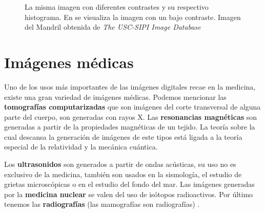 \begin{figure}[h]
    \centering


    \bigskip


    \bigskip


  \caption[Histogramas]{La misma imagen con diferentes contrastes y su
  respectivo histograma. En \protect{} se visualiza la imagen con
  un bajo contraste. Imagen del Mandril obtenida de \textit{The USC-SIPI Image
  Database}}
  
  \label{fig:histograms}
\end{figure}

\section{Imágenes médicas}

Uno de los usos más importantes de las imágenes digitales recae en la medicina,
existe una gran variedad de imágenes médicas. Podemos mencionar las
\textbf{tomografías computarizadas} que son imágenes del corte transversal de
alguna parte del cuerpo, son generadas con rayos X. Las \textbf{resonancias
magnéticas} son generadas a partir de la propiedades magnéticas de un tejido.
La teoría sobre la cual descansa la generación de imágenes de este tipos está
ligada a la teoría especial de la relatividad y la mecánica cuántica.

Los \textbf{ultrasonidos} son generados a partir de ondas acústicas, su uso no
es exclusivo de la medicina, también son usados en la sismología, el estudio de
grietas microscópicas o en el estudio del fondo del mar. Las imágenes generadas
por la \textbf{medicina nuclear} se valen del uso de isótopos radioactivos. Por
último tenemos las \textbf{radiografías} (las mamografías son radiografías)
\cite{suetens2009fundamentals}.

